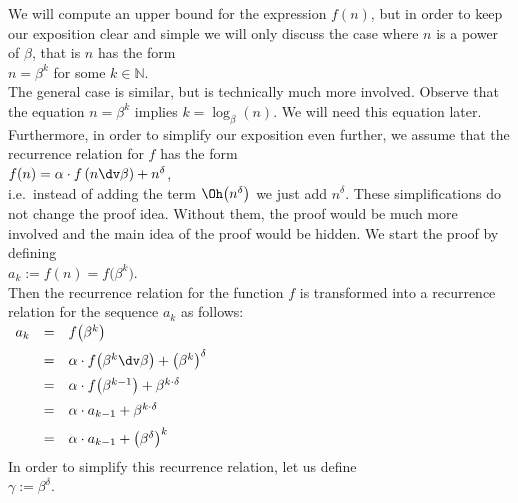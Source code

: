 \proof
We will compute an upper bound for the expression $f(n)$, but in order to keep our exposition clear
and simple we will only discuss the case where $n$ is a power of $\beta$, that is $n$ has the form
\\[0.2cm]
\hspace*{1.3cm}
$n = \beta^k$ \quad for some $k \in \mathbb{N}$.
\\[0.2cm]
The general case is similar, but is technically much more involved.
Observe that the equation $n = \beta^k$ implies $k = \log_{\beta}(n)$.  We will need this equation later. 
Furthermore, in order to simplify our exposition even further, we assume that the recurrence
relation for $f$ has the form 
\\[0.2cm]
\hspace*{1.3cm}
 $f(n) = \alpha \cdot f\left(n \dv \beta\right) + n^\delta$,
\\[0.2cm]
i.e.~instead of adding the term $\Oh\bigl(n^\delta\bigr)$ we just add $n^\delta$.  These
simplifications do not change the proof idea.  Without them, the proof would be much more involved and the main
idea of the proof would be hidden.  We start the proof by defining
\\[0.2cm]
\hspace*{1.3cm}
 $a_k := f(n) = f\bigl(\beta^k\bigr)$.  
\\[0.2cm]
Then the recurrence relation for the function $f$
is transformed into a recurrence relation for the sequence $a_k$ as follows:
\\[0.2cm]
\hspace*{1.3cm}
$
\begin{array}[t]{lcl}
a_k & = & f\bigl(\beta^{k}\bigr)                                             \\[0.2cm]
    & = & \alpha \cdot f\bigl(\beta^{k} \dv \beta\bigr) + \bigl(\beta^{k}\bigr)^\delta    \\[0.2cm]
    & = & \alpha \cdot f\bigl(\beta^{k-1}\bigr) + \beta^{k \cdot \delta}    \\[0.2cm]
    & = & \alpha \cdot a_{k-1} + \beta^{k \cdot \delta}    \\[0.2cm]
    & = & \alpha \cdot a_{k-1} + \bigl(\beta^{\delta}\bigr)^k    \\[0.2cm]
\end{array}
$
\\[0.2cm]
In order to simplify this recurrence relation, let us define
\\[0.2cm]
\hspace*{1.3cm}
$\gamma := \beta^{\delta}$.
